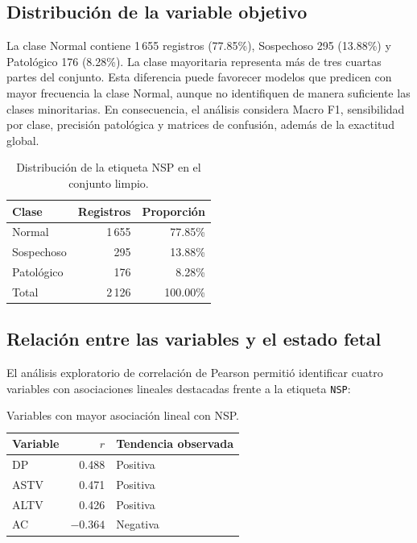 \subsection{Distribuci\'on de la variable objetivo}
La clase Normal contiene 1\,655 registros (77.85\%), Sospechoso 295 (13.88\%) y Patol\'ogico 176 (8.28\%). La clase mayoritaria representa m\'as de tres cuartas partes del conjunto. Esta diferencia puede favorecer modelos que predicen con mayor frecuencia la clase Normal, aunque no identifiquen de manera suficiente las clases minoritarias. En consecuencia, el an\'alisis considera Macro F1, sensibilidad por clase, precisi\'on patol\'ogica y matrices de confusi\'on, adem\'as de la exactitud global.

\begin{table}[t]
\centering
\caption{Distribuci\'on de la etiqueta NSP en el conjunto limpio.}
\label{tab:clases}
\small
\begin{tabular}{lrr}
\toprule
Clase & Registros & Proporci\'on \\
\midrule
Normal & 1\,655 & 77.85\% \\
Sospechoso & 295 & 13.88\% \\
Patol\'ogico & 176 & 8.28\% \\
\midrule
Total & 2\,126 & 100.00\% \\
\bottomrule
\end{tabular}
\end{table}

\subsection{Relaci\'on entre las variables y el estado fetal}
El an\'alisis exploratorio de correlaci\'on de Pearson permiti\'o identificar cuatro variables con asociaciones lineales destacadas frente a la etiqueta \texttt{NSP}:
\begin{table}[t]
\centering
\caption{Variables con mayor asociaci\'on lineal con NSP.}
\label{tab:correlaciones}
\small
\begin{tabular}{lrl}
\toprule
Variable & $r$ & Tendencia observada \\
\midrule
DP & 0.488 & Positiva \\
ASTV & 0.471 & Positiva \\
ALTV & 0.426 & Positiva \\
AC & $-0.364$ & Negativa \\
\bottomrule
\end{tabular}
\end{table}

